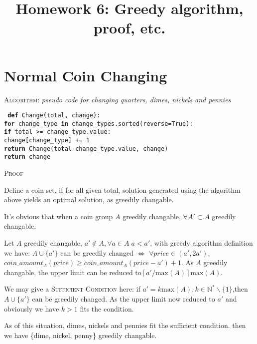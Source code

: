 \documentclass[UTF8]{article}
\begin{document}
    \title{Homework 6: Greedy algorithm, proof, etc.}
    \date{}
    \maketitle
    \section{Normal Coin Changing}
    \noindent \textsc{Algorithm}: \textit{pseudo code for changing quarters, dimes, nickels and pennies}
    \begin{adjustwidth}{1cm}{0cm}
         \tt 
        \noindent \textbf{def} Change(total, change):\\
        \indent \noindent \textbf{for} change\_type \textbf{in} change\_types.sorted(reverse=True):\\
        \indent \indent \noindent \textbf{if} total >= change\_type.value:\\
        \indent \indent \indent \noindent change[change\_type] += 1\\
        \indent \indent \indent \noindent \textbf{return} Change(total-change\_type.value, change)\\
        \indent \noindent \textbf{return} change
    \end{adjustwidth}\par\par
    \noindent \textsc{Proof}\par
    Define a coin set, if for all given total, solution generated using the algorithm above yields an optimal solution, as greedily changable.

    It's obvious that when a coin group $A$ greedily changable, $\forall A' \subset A$ greedily changable.

    Let $A$ greedily changable, $a' \notin A, \forall a \in A\; a < a'$, with greedy algorithm definition we have: $A\cup\{a'\}$ can be greedily changed $\Leftrightarrow$ $\forall price \in (a', 2a')$, $coin\_amount_{A}(price) \geq coin\_amount_{A}(price-a')+1$. As $A$ greedily changable, the upper limit can be reduced to$ \left\lceil a'/\mathrm{max}(A)\right\rceil \mathrm{max}(A)$.

    We may give a \textsc{Sufficient Condition} here: if $a' = k\mathrm{max}(A), k \in \mathbb{N^*}\backslash \{1\}$,then $A\cup\{a'\}$ can be greedily changed. As the upper limit now reduced to $a'$ and obviously we have $k > 1$ fits the condition.

    As of this situation, dimes, nickels and pennies fit the sufficient condition. then we have \{dime, nickel, penny\} greedily changable.
\end{document}

